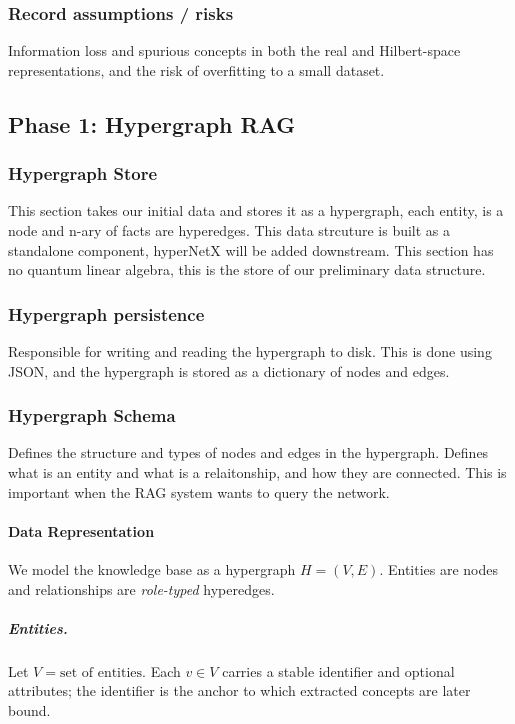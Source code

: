 \documentclass[twoside,10pt]{article}
\begin{document}
\subsubsection{Record assumptions / risks}
Information loss and spurious concepts in both the real and Hilbert-space representations, and the risk of overfitting to a small dataset.

\subsection{Phase 1: Hypergraph RAG}
\fontsize{12}{14}\selectfont
\subsubsection{Hypergraph Store}
This section takes our initial data and stores it as a hypergraph, each entity, is a node and n-ary of facts are hyperedges. 
This data strcuture is built as a standalone component, hyperNetX will be added downstream. 
This section has no quantum linear algebra, this is the store of our preliminary data structure.

\subsubsection{Hypergraph persistence}
Responsible for writing and reading the hypergraph to disk. 
This is done using JSON, and the hypergraph is stored as a dictionary of nodes and edges.

\subsubsection{Hypergraph Schema}
Defines the structure and types of nodes and edges in the hypergraph. 
Defines what is an entity and what is a relaitonship, and how they are connected. 
This is important when the RAG system wants to query the network. 

\paragraph{Data Representation}
We model the knowledge base as a hypergraph $H = (V, E)$. 
Entities are nodes and relationships are \emph{role-typed} hyperedges.

\subparagraph{Entities.} Let $V =\text{set of entities}$. 
Each $v \in V$ carries a stable identifier and optional attributes; the identifier is the anchor to which
extracted concepts are later bound.
\end{document}
